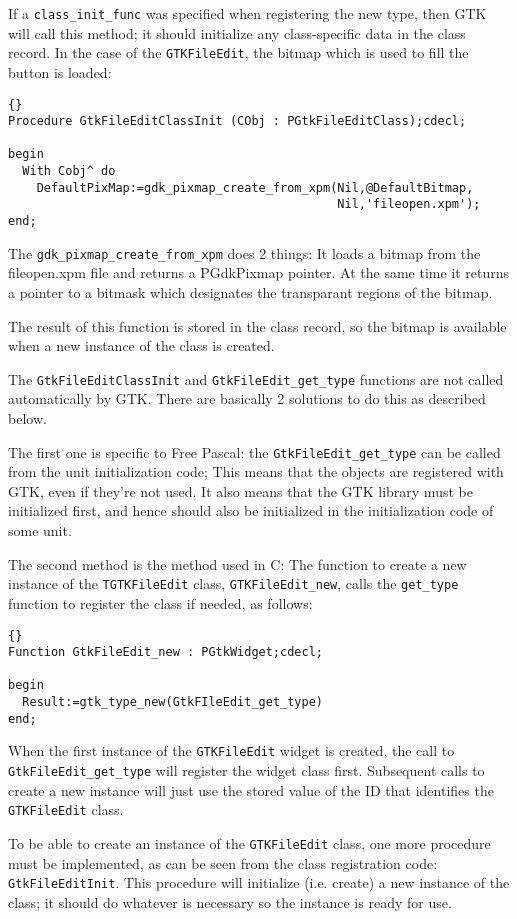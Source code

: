 \documentclass[10pt]{article}
\begin{document}
If a \lstinline|class_init_func| was specified when registering the new type,
then GTK will call this method; it should initialize any class-specific 
data in the class record. In the case of the \lstinline|GTKFileEdit|, the bitmap 
which is used to fill the button is loaded:
\begin{lstlisting}{}
Procedure GtkFileEditClassInit (CObj : PGtkFileEditClass);cdecl;
   
begin
  With Cobj^ do
    DefaultPixMap:=gdk_pixmap_create_from_xpm(Nil,@DefaultBitmap,
                                              Nil,'fileopen.xpm');
end;
\end{lstlisting}
The \lstinline|gdk_pixmap_create_from_xpm| does 2 things: It loads a bitmap
from the \textsf{fileopen.xpm} file and returns a PGdkPixmap pointer.
At the same time it returns a pointer to a bitmask which designates the
transparant regions of the bitmap.

The result of this function is stored in the class record, so the bitmap
is available when a new instance of the class is created.

The \lstinline|GtkFileEditClassInit| and \lstinline|GtkFileEdit_get_type| 
functions are not called automatically by GTK. There are basically
2 solutions to do this as described below.

The first one is specific to Free Pascal: the \lstinline|GtkFileEdit_get_type|
can be called from the unit initialization code; This means that the objects 
are registered with GTK, even if they're not used. It also means that the
GTK library must be initialized first, and hence should also be initialized
in the initialization code of some unit.

The second method is the method used in C: The function to create a new
instance of the \lstinline|TGTKFileEdit| class, \lstinline|GTKFileEdit_new|,
calls the \lstinline|get_type| function to register the class if needed,
as follows:
\begin{lstlisting}{}
Function GtkFileEdit_new : PGtkWidget;cdecl;

begin
  Result:=gtk_type_new(GtkFIleEdit_get_type)
end;
\end{lstlisting}
When the first instance of the \lstinline|GTKFileEdit| widget is created, the 
call to \lstinline|GtkFileEdit_get_type| will register the widget class 
first. Subsequent calls to create a new instance will just use the stored 
value of the ID that identifies the \lstinline|GTKFileEdit| class.

To be able to create an instance of the \lstinline|GTKFileEdit| class, one
more procedure must be implemented, as can be seen from the class
registration code: \lstinline|GtkFileEditInit|. This procedure will 
initialize (i.e. create) a new instance of the class; it should do
whatever is necessary so the instance is ready for use.
\end{document}
